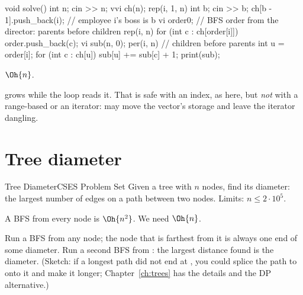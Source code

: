 \begin{code}
void solve() {
    int n;
    cin >> n;
    vvi ch(n);
    rep(i, 1, n) {
        int b;
        cin >> b;
        ch[b - 1].push_back(i);  // employee i's boss is b
    }
    vi order{0};  // BFS order from the director: parents before children
    rep(i, n) for (int c : ch[order[i]]) order.push_back(c);
    vi sub(n, 0);
    per(i, n) {  // children before parents
        int u = order[i];
        for (int c : ch[u]) sub[u] += sub[c] + 1;
    }
    print(sub);
}
\end{code}

 $\Oh{n}$.

\begin{tip}
 grows while the loop reads it. That is safe with an index, as here, but \emph{not} with a range-based 
or an iterator:  may move the vector's storage and leave the iterator dangling.
\end{tip}

\section[Tree diameter]{Tree diameter \hfill \gold}\label{wp:diameter}

\begin{statement}{Tree Diameter}{CSES Problem Set}
Given a tree with $n$ nodes, find its diameter: the largest number of edges on a path between two nodes.
Limits: $n \le 2\cdot 10^5$.
\end{statement}

 A BFS from every node is $\Oh{n^2}$. We need $\Oh{n}$.

 Run a BFS from any node; the node  that is farthest from it is always one end of some
diameter. Run a second BFS from : the largest distance found is the diameter. (Sketch: if a longest path did not end
at , you could splice the path to  onto it and make it longer; Chapter~\ref{ch:trees} has the details and
the DP alternative.)


